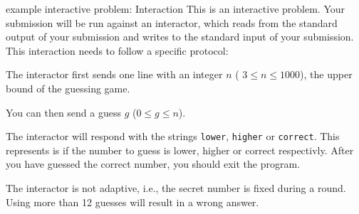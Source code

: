 \documentclass[11pt,pdf, aspectratio=169]{beamer}
\begin{document}
  \begin{frame}{example interactive problem: Interaction}
    This is an interactive problem.
    Your submission will be run against an interactor, which reads from the standard output of your submission and writes to the standard input of your submission.
    This interaction needs to follow a specific protocol:

    The interactor first sends one line with an integer $n$ ( $3 \leq n \leq 1000$), the upper bound of the guessing game.

    You can then send a guess $g$ ($0\leq g \leq n$).

    The interactor will respond with the strings \texttt{lower}, \texttt{higher} or \texttt{correct}.
    This represents is if the number to guess is lower, higher or correct respectivly.
    After you have guessed the correct number, you should exit the program.

    The interactor is not adaptive, i.e., the secret number is fixed during a round.
    Using more than 12 guesses will result in a wrong answer.
  \end{frame}
\end{document}
